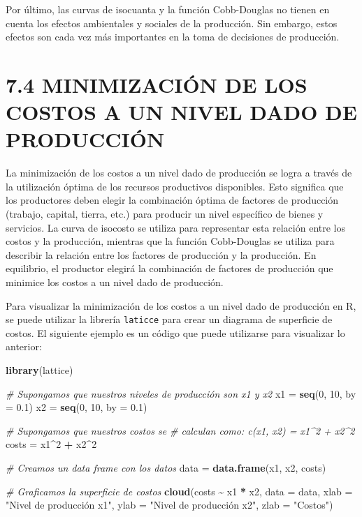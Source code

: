 \documentclass[
  spanish,
  12pt,
]{book}
\newenvironment{Shaded}{\begin{snugshade}}{\end{snugshade}}
\newcommand{\AttributeTok}[1]{\textcolor[rgb]{0.13,0.29,0.53}{#1}}
\newcommand{\CommentTok}[1]{\textcolor[rgb]{0.56,0.35,0.01}{\textit{#1}}}
\newcommand{\DecValTok}[1]{\textcolor[rgb]{0.00,0.00,0.81}{#1}}
\newcommand{\FloatTok}[1]{\textcolor[rgb]{0.00,0.00,0.81}{#1}}
\newcommand{\FunctionTok}[1]{\textcolor[rgb]{0.13,0.29,0.53}{\textbf{#1}}}
\newcommand{\NormalTok}[1]{#1}
\newcommand{\OtherTok}[1]{\textcolor[rgb]{0.56,0.35,0.01}{#1}}
\newcommand{\SpecialCharTok}[1]{\textcolor[rgb]{0.81,0.36,0.00}{\textbf{#1}}}
\newcommand{\StringTok}[1]{\textcolor[rgb]{0.31,0.60,0.02}{#1}}
\begin{document}
Por último, las curvas de isocuanta y la función Cobb-Douglas no tienen
en cuenta los efectos ambientales y sociales de la producción. Sin
embargo, estos efectos son cada vez más importantes en la toma de
decisiones de producción.

\section{7.4 MINIMIZACIÓN DE LOS COSTOS A UN NIVEL DADO DE
PRODUCCIÓN}\label{minimizaciuxf3n-de-los-costos-a-un-nivel-dado-de-producciuxf3n}

La minimización de los costos a un nivel dado de producción se logra a
través de la utilización óptima de los recursos productivos disponibles.
Esto significa que los productores deben elegir la combinación óptima de
factores de producción (trabajo, capital, tierra, etc.) para producir un
nivel específico de bienes y servicios. La curva de isocosto se utiliza
para representar esta relación entre los costos y la producción,
mientras que la función Cobb-Douglas se utiliza para describir la
relación entre los factores de producción y la producción. En
equilibrio, el productor elegirá la combinación de factores de
producción que minimice los costos a un nivel dado de producción.

Para visualizar la minimización de los costos a un nivel dado de
producción en R, se puede utilizar la librería \texttt{laticce} para
crear un diagrama de superficie de costos. El siguiente ejemplo es un
código que puede utilizarse para visualizar lo anterior:

\begin{Shaded}
\begin{Highlighting}[]
\FunctionTok{library}\NormalTok{(lattice)}

\CommentTok{\# Supongamos que nuestros niveles de producción son x1 y x2}
\NormalTok{x1 }\OtherTok{=} \FunctionTok{seq}\NormalTok{(}\DecValTok{0}\NormalTok{, }\DecValTok{10}\NormalTok{, }\AttributeTok{by =} \FloatTok{0.1}\NormalTok{)}
\NormalTok{x2 }\OtherTok{=} \FunctionTok{seq}\NormalTok{(}\DecValTok{0}\NormalTok{, }\DecValTok{10}\NormalTok{, }\AttributeTok{by =} \FloatTok{0.1}\NormalTok{)}

\CommentTok{\# Supongamos que nuestros costos se }
\CommentTok{\# calculan como: c(x1, x2) = x1\^{}2 + x2\^{}2}
\NormalTok{costs }\OtherTok{=}\NormalTok{ x1}\SpecialCharTok{\^{}}\DecValTok{2} \SpecialCharTok{+}\NormalTok{ x2}\SpecialCharTok{\^{}}\DecValTok{2}

\CommentTok{\# Creamos un data frame con los datos}
\NormalTok{data }\OtherTok{=} \FunctionTok{data.frame}\NormalTok{(x1, x2, costs)}

\CommentTok{\# Graficamos la superficie de costos}
\FunctionTok{cloud}\NormalTok{(costs }\SpecialCharTok{\textasciitilde{}}\NormalTok{ x1 }\SpecialCharTok{*}\NormalTok{ x2, }\AttributeTok{data =}\NormalTok{ data, }
      \AttributeTok{xlab =} \StringTok{"Nivel de producción x1"}\NormalTok{, }
      \AttributeTok{ylab =} \StringTok{"Nivel de producción x2"}\NormalTok{,}
      \AttributeTok{zlab =} \StringTok{"Costos"}\NormalTok{)}
\end{Highlighting}
\end{Shaded}
\end{document}
